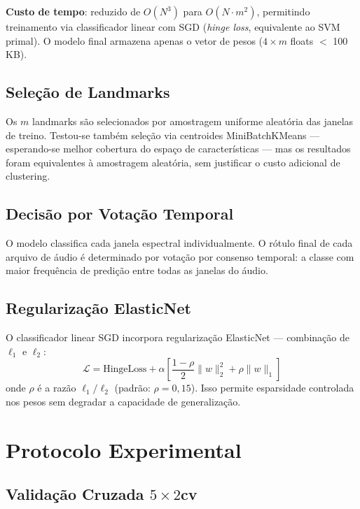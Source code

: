 \documentclass[a4paper,12pt]{article}
\begin{document}
\textbf{Custo de tempo}: reduzido de $O(N^3)$ para $O(N \cdot m^2)$, permitindo treinamento via classificador linear com SGD (\textit{hinge loss}, equivalente ao SVM primal). O modelo final armazena apenas o vetor de pesos ($4 \times m$ floats $<$ 100\,KB).

\subsection{Seleção de Landmarks}

Os $m$ landmarks são selecionados por amostragem uniforme aleatória das janelas de treino. Testou-se também seleção via centroides MiniBatchKMeans — esperando-se melhor cobertura do espaço de características — mas os resultados foram equivalentes à amostragem aleatória, sem justificar o custo adicional de clustering.

\subsection{Decisão por Votação Temporal}

O modelo classifica cada janela espectral individualmente. O rótulo final de cada arquivo de áudio é determinado por votação por consenso temporal: a classe com maior frequência de predição entre todas as janelas do áudio.

\subsection{Regularização ElasticNet}

O classificador linear SGD incorpora regularização ElasticNet — combinação de $\ell_1$ e $\ell_2$:
\begin{equation}
    \mathcal{L} = \text{HingeLoss} + \alpha \left[ \frac{1-\rho}{2} \|w\|_2^2 + \rho \|w\|_1 \right]
\end{equation}
onde $\rho$ é a razão $\ell_1/\ell_2$ (padrão: $\rho = 0{,}15$). Isso permite esparsidade controlada nos pesos sem degradar a capacidade de generalização.

\section{Protocolo Experimental}

\subsection{Validação Cruzada $5\times2$cv}
\end{document}
